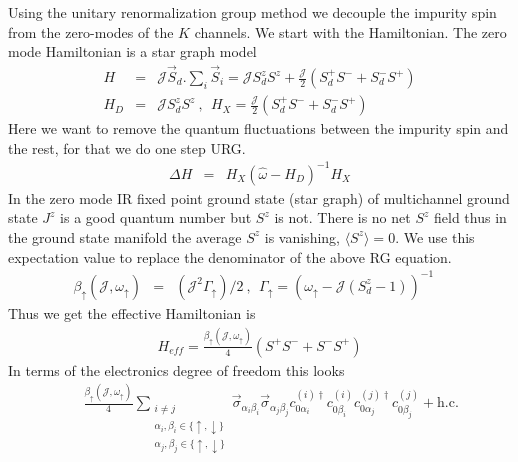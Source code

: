 \documentclass[reprint,prb,superscriptaddress]{revtex4-2}
\begin{document}
\noindent Using the unitary renormalization group method we decouple the impurity spin from the zero-modes of the $K$ channels. We start with the Hamiltonian. The zero mode Hamiltonian is a star graph model 
\begin{eqnarray}
H &=& {\mathcal{J}} \vec{S}_d.\displaystyle\sum_i \vec{S}_i ={\mathcal{J}} S_d^zS^z + \frac{{\mathcal{J}}}{2} (S_d^+S^-+ S_d^-S^+) \nonumber\\
H_D &=& {\mathcal{J}} S^z_d S^z~,~~ H_X = \frac{{\mathcal{J}}}{2} (S_d^+S^-+ S_d^-S^+)
\end{eqnarray}
Here we want to remove the quantum fluctuations between the impurity spin and the rest, for that we do one step URG.
\begin{eqnarray}
\Delta H &=& H_X ({\hat{\omega}-H_D})^{-1} H_X 
\end{eqnarray}
In the zero mode IR fixed point ground state (star graph) of multichannel ground state $J^z$ is a good quantum number but $S^z$ is not. There is no net $S^z$ field thus in the ground state manifold the average $S^z$ is vanishing, $\langle S^z \rangle=0$. We use this expectation value to replace the denominator of the above RG equation.
\begin{eqnarray}
\beta_{\uparrow} ({\mathcal{J}},\omega_{\uparrow})&=& ({\mathcal{J}}^2 \Gamma_{\uparrow})/2 ~,~~\Gamma_{\uparrow}=(\omega_{\uparrow}-{\mathcal{J}}(S_d^z-1))^{-1}~~~~
\end{eqnarray}
Thus we get the effective Hamiltonian is 
\begin{eqnarray}
H_{eff} 
 =\frac{\beta_{\uparrow}({\mathcal{J}},\omega_{\uparrow})}{4} (S^+S^-+S^-S^+)   
\end{eqnarray}
In terms of the electronics degree of freedom this looks 
\begin{eqnarray}
&& \frac{ \beta_{\uparrow}({\mathcal{J}},\omega_{\uparrow}) }{4}   \displaystyle\sum_{\substack{i\neq j \\ \alpha_i,\beta_i\in \{\uparrow,\downarrow\}\\ \alpha_j,\beta_j\in \{\uparrow,\downarrow\}}}\vec{\sigma}_{\alpha_i\beta_i}\vec{\sigma}_{\alpha_j\beta_j}  c_{0\alpha_i}^{(i)\dagger}  c_{0\beta_i}^{(i)}    c_{0\alpha_j}^{(j)\dagger}  c_{0\beta_j}^{(j)} +\textrm{h.c.}   \nonumber
\label{eq:all-to-all_1}
\end{eqnarray}
\end{document}
